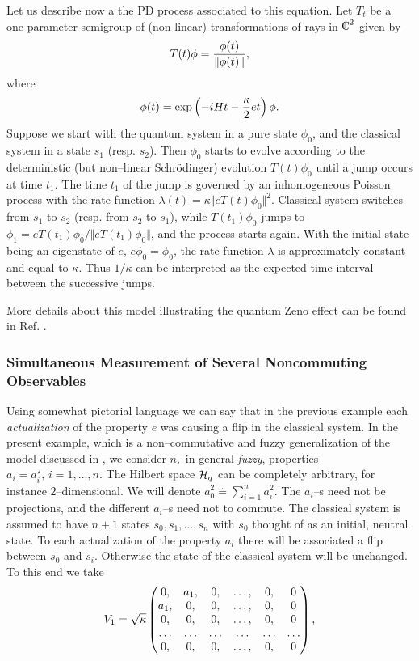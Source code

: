 \documentclass[12pt]{article}
\def\complex{{\kern .1em {\raise .47ex \hbox
{$\scriptscriptstyle
|$}}
\kern -.4em {\rm C}}}
\def\be{\begin{equation}} \def\ee{\end{equation}}
\begin{document}
Let us describe now a the PD process associated to this equation. 
Let
$T_t$ be a one-parameter semigroup of  (non-linear) transformations of
rays in
$\complex^2$ given by
\be T (t)\phi  ={\phi  (t) \over \Vert \phi  (t) \Vert}, 
\ee where
\be
\phi  (t)=\exp\left ({-iHt-{\kappa\over 2}et}\right)
\phi . 
\ee    Suppose we start with the quantum system in a pure state
$\phi_0$,  and  the classical system in a state
$s_1$  (resp.  $s_2$).  Then $\phi_0$ starts to evolve according to the
deterministic  (but non--linear Schr\"odinger) evolution $T (t)\phi_0 $ until a
jump occurs at time $t_1$.  The time $t_1$ of the jump is governed by
an inhomogeneous Poisson process with the rate function
$\lambda  (t) = \kappa \Vert e T (t)\phi_0 \Vert^2$.  Classical system
switches from $s_1$ to $s_2$  (resp.  from $s_2$ to $s_1$),  while  
$T (t_1)\phi_0$ jumps to
$\phi_1=eT (t_1)\phi_0/\Vert eT (t_1)\phi_0 \Vert$,  
and the process starts again.  With the initial
state being an eigenstate of $e$,  $e\phi_0=\phi_0$,  the rate
function $\lambda$ is approximately constant and equal to $\kappa$. 
Thus
${1/\kappa}$ can be interpreted as the expected time interval between
the successive jumps.

More details about this model illustrating the quantum Zeno effect
can be found in Ref.  \cite{bla2}. 
\subsubsection{Simultaneous Measurement of Several Noncommuting Observables}

Using somewhat pictorial language we can say that in the previous
example each {\sl actualization} of the property
 $e$ was causing a flip in the classical system.  In the present
example,  which is a non--commutative and fuzzy generalization of the model 
discussed in \cite{bla1},  we
consider
$n , $   in general {\sl fuzzy},  properties
$a_i=a_i^\star , \,  i=1, \ldots , n. $ 
The Hilbert space ${\cal H}_q$ can be completely arbitrary, 
for instance $2$--dimensional.    We will
denote
$a_0^2\doteq\sum_{i=1}^n a_i^2 . $ The 
$a_i$--s need not be projections,  and the different $a_i$--s 
need not to commute.   The classical system
is assumed to have
$n+1$ states
$s_0, s_1, \ldots , s_n$ with $s_0$ thought of as an initial,  
neutral state. 
  To
each actualization of the property $a_i$ there will be associated a
flip between
$s_0$ and
$s_i . $  Otherwise
the state of the classical system will be unchanged.  To this end we
take 
$$V_{1} ={\sqrt\kappa}
 \begin{pmatrix}0,     & a_{1} ,  &0 ,  &\ldots ,  &0 ,    
&0
\cr
                   a_{1}, & 0     ,  &0 ,  &\ldots ,  &0 ,     &0 \cr
                   0,    & 0     ,  &0 ,  &\ldots ,  &0 ,     &0\cr
\ldots&\ldots   &\ldots&\ldots &\ldots&\ldots\cr
                   0    , & 0     ,  &0 ,  &\ldots ,  &0 ,    &0\end{pmatrix} , $$
\end{document}
